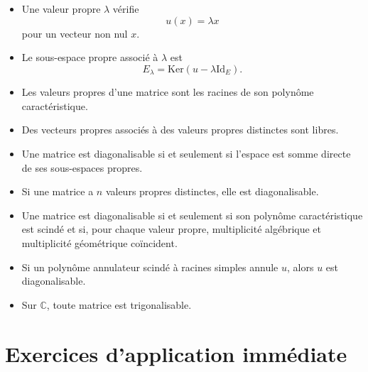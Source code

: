 \documentclass[11pt,a4paper]{article}
\theoremstyle{remark}
\newcommand{\C}{\mathbb{C}}
\newcommand{\Ker}{\mathrm{Ker}}
\newcommand{\id}{\mathrm{Id}}
\begin{document}
\begin{itemize}
    \item Une valeur propre \(\lambda\) vérifie
    \[
    u(x)=\lambda x
    \]
    pour un vecteur non nul \(x\).
    \item Le sous-espace propre associé à \(\lambda\) est
    \[
    E_\lambda=\Ker(u-\lambda\id_E).
    \]
    \item Les valeurs propres d’une matrice sont les racines de son polynôme caractéristique.
    \item Des vecteurs propres associés à des valeurs propres distinctes sont libres.
    \item Une matrice est diagonalisable si et seulement si l’espace est somme directe de ses sous-espaces propres.
    \item Si une matrice a \(n\) valeurs propres distinctes, elle est diagonalisable.
    \item Une matrice est diagonalisable si et seulement si son polynôme caractéristique est scindé et si, pour chaque valeur propre, multiplicité algébrique et multiplicité géométrique coïncident.
    \item Si un polynôme annulateur scindé à racines simples annule \(u\), alors \(u\) est diagonalisable.
    \item Sur \(\C\), toute matrice est trigonalisable.
\end{itemize}

\section*{Exercices d’application immédiate}
\end{document}
